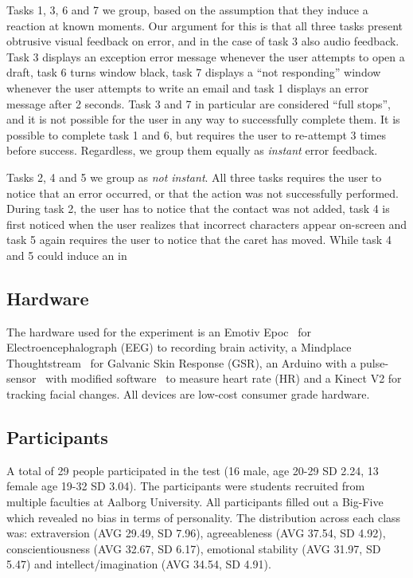 Tasks 1, 3, 6 and 7 we group, based on the assumption that they induce a reaction at known moments. Our argument for
this is that all three tasks present obtrusive visual feedback on error, and in the case of task 3 also audio
feedback. Task 3 displays an exception error message whenever the user attempts to open a draft, task 6 turns window
black, task 7 displays a ``not responding'' window whenever the user attempts to write an email and task 1 displays an
error message after 2 seconds. Task 3 and 7 in particular are considered ``full stops'', and it is not possible for the
user in any way to successfully complete them. It is possible to complete task 1 and 6, but requires the user to
re-attempt 3 times before success. Regardless, we group them equally as \textit{instant} error feedback.

Tasks 2, 4 and 5 we group as \textit{not instant}. All three tasks requires the user to notice that an error occurred, or
that the action was not successfully performed. During task 2, the user has to notice that the contact was not added,
task 4 is first noticed when the user realizes that incorrect characters appear on-screen and task 5 again requires the
user to notice that the caret has moved. While task 4 and 5 could induce an in 



\subsection{Hardware}
The hardware used for the experiment is an Emotiv Epoc~\cite{emotiv_epoc_website} for Electroencephalograph (EEG) to recording brain activity, a Mindplace Thoughtstream~\cite{thoughtstream} for Galvanic Skin Response (GSR), an Arduino with a pulse-sensor~\cite{pulsesensor} with modified software~\cite{pulsesensorgit} to measure heart rate (HR) and a Kinect V2\cite{kinect_specs3} for tracking facial changes.
All devices are low-cost consumer grade hardware.

\subsection{Participants}
A total of 29 people participated in the test (16 male, age 20-29 SD 2.24, 13 female age 19-32 SD 3.04).
The participants were students recruited from multiple faculties at Aalborg University. 
All participants filled out a Big-Five\cite{big5} which revealed no bias in terms of personality. 
The distribution across each class was: extraversion (AVG 29.49, SD 7.96), agreeableness (AVG 37.54, SD 4.92), conscientiousness (AVG 32.67, SD 6.17), emotional stability (AVG 31.97, SD 5.47) and intellect/imagination (AVG 34.54, SD 4.91).

